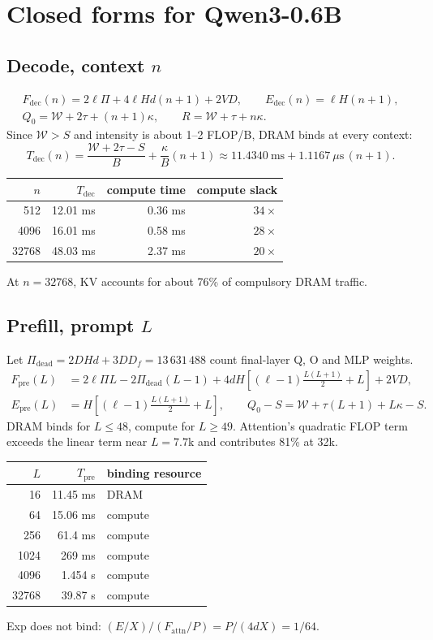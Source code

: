 \documentclass[11pt]{article}
\theoremstyle{definition}
\theoremstyle{remark}
\newcommand{\W}{\mathcal{W}}
\newcommand{\Pdead}{\Pi_{\mathrm{dead}}}
\newcommand{\Tdec}{T_{\mathrm{dec}}}
\newcommand{\Tpre}{T_{\mathrm{pre}}}
\begin{document}
\section{Closed forms for Qwen3-0.6B}\label{sec:closed}
\subsection{Decode, context \texorpdfstring{$n$}{n}}
\begin{gather}
F_{\mathrm{dec}}(n)=2\ell\Pi+4\ell Hd(n+1)+2VD,\qquad E_{\mathrm{dec}}(n)=\ell H(n+1),\\
Q_0=\W+2\tau+(n+1)\kappa,\qquad R=\W+\tau+n\kappa.
\end{gather}
Since $\W>S$ and intensity is about 1--2 FLOP/B, DRAM binds at every context:
\begin{equation}
\boxed{\Tdec(n)=\frac{\W+2\tau-S}{B}+\frac{\kappa}{B}(n+1)
\approx11.4340\ \text{ms}+1.1167\ \mu\text{s}\,(n+1).}
\end{equation}
\begin{center}
\begin{tabular}{rrrr}
\toprule
$n$ & $\Tdec$ & compute time & compute slack \\
\midrule
512 & 12.01 ms & 0.36 ms & $34\times$ \\
4096 & 16.01 ms & 0.58 ms & $28\times$ \\
32768 & 48.03 ms & 2.37 ms & $20\times$ \\
\bottomrule
\end{tabular}
\end{center}
At $n=32768$, KV accounts for about 76\% of compulsory DRAM traffic.

\subsection{Prefill, prompt \texorpdfstring{$L$}{L}}
Let $\Pdead=2DHd+3DD_f=13\,631\,488$ count final-layer Q, O and MLP weights.
\begin{align}
F_{\mathrm{pre}}(L)&=2\ell\Pi L-2\Pdead(L-1)
+4dH\left[(\ell-1)\frac{L(L+1)}{2}+L\right]+2VD,\\
E_{\mathrm{pre}}(L)&=H\left[(\ell-1)\frac{L(L+1)}{2}+L\right],\qquad
Q_0-S=\W+\tau(L+1)+L\kappa-S.
\end{align}
DRAM binds for $L\le48$, compute for $L\ge49$. Attention's quadratic FLOP term exceeds the
linear term near $L=7.7$k and contributes 81\% at 32k.
\begin{center}
\begin{tabular}{rrl}
\toprule
$L$ & $\Tpre$ & binding resource \\
\midrule
16 & 11.45 ms & DRAM \\
64 & 15.06 ms & compute \\
256 & 61.4 ms & compute \\
1024 & 269 ms & compute \\
4096 & 1.454 s & compute \\
32768 & 39.87 s & compute \\
\bottomrule
\end{tabular}
\end{center}
Exp does not bind: $(E/X)/(F_{\mathrm{attn}}/P)=P/(4dX)=1/64$.
\end{document}
